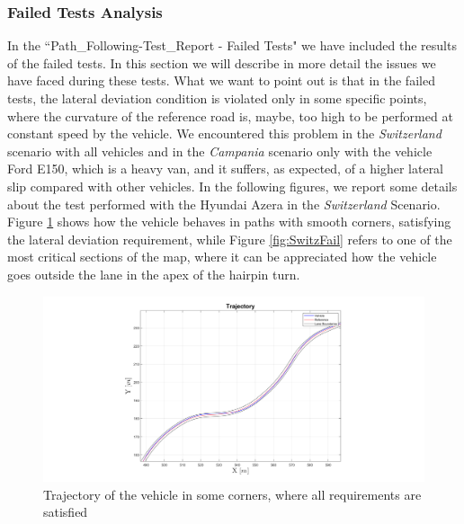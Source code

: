 \subsubsection{Failed Tests Analysis}
In the ``Path\_Following-Test\_Report - Failed Tests" we have included the results of the failed tests. In this section we will describe in more detail the issues we have faced during these tests.
What we want to point out is that in the failed tests, the lateral deviation condition is violated only in some specific points, where the curvature of the reference road is, maybe, too high to be performed at constant speed by the vehicle. We encountered this problem in the \textit{Switzerland} scenario with all vehicles and in the \textit{Campania} scenario only with the vehicle Ford E150, which is a heavy van, and it suffers, as expected, of a higher lateral slip compared with other vehicles.
In the following figures, we report some details about the test performed with the Hyundai Azera in the \textit{Switzerland} Scenario. Figure \ref{fig:SwitzPass} shows how the vehicle behaves in paths with smooth corners, satisfying the lateral deviation requirement, while Figure \ref{fig:SwitzFail} refers to one of the most critical sections of the map, where it can be appreciated how the vehicle goes outside the lane in the apex of the hairpin turn.


    \begin{figure}[H]
    \centering
    \includegraphics[width=1\textwidth]{Figures/Switz_pass.png}
    \caption{Trajectory of the vehicle in some corners, where all requirements are satisfied}
      \label{fig:SwitzPass}
\end{figure}

